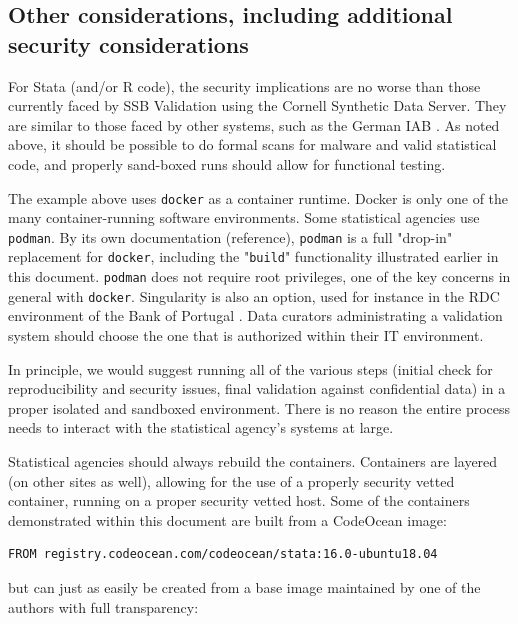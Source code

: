 \documentclass[]{hdsr}
\begin{document}
\subsection{Other considerations, including additional security considerations}

For Stata (and/or R code), the security implications are no worse than those currently faced by SSB Validation using the Cornell Synthetic Data Server. They are similar to those faced by other systems, such as the German IAB \citep{bender_research-data-centre_2011,muller_institute_2021}. As noted above, it should be possible to do formal scans for malware and valid statistical code, and properly sand-boxed runs should allow for functional testing.

The example above uses \texttt{docker} as a container runtime. Docker is only one of the many container-running software environments. Some statistical agencies use \texttt{podman}. By its own documentation (reference), \texttt{podman} is a full "drop-in" replacement for  \texttt{docker}, including the "\texttt{build}" functionality illustrated earlier in this document. \texttt{podman} does not require root privileges, one of the key concerns in general with \texttt{docker}. Singularity is also an option, used for instance in the RDC environment of the Bank of Portugal \citep{guimaraes_reproducibility_2023}. Data curators administrating a validation system should choose the one that is authorized within their IT environment. 

In principle, we would suggest running all of the various steps (initial check for reproducibility and security issues, final validation against confidential data) in a proper isolated and sandboxed environment. There is no reason the entire process needs to interact with the statistical agency's systems at large.

Statistical agencies should always rebuild the containers. Containers are layered (on other sites as well), allowing for the use of a properly security vetted container, running on a proper security vetted host. Some of the containers demonstrated within this document are built from a CodeOcean image:

\begin{lstlisting}[language=docker]
FROM registry.codeocean.com/codeocean/stata:16.0-ubuntu18.04
\end{lstlisting}

but can just as easily be created from a base image maintained by one of the authors with full transparency:
\end{document}
